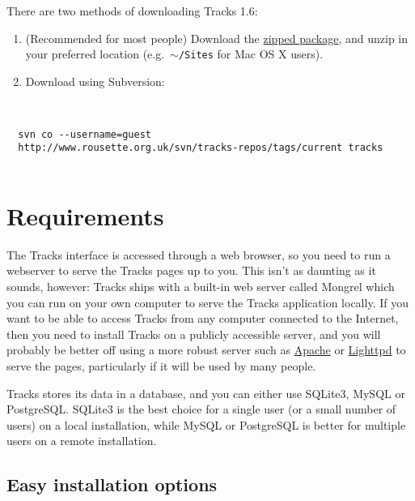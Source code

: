 \documentclass[10pt,twoside]{memoir}
\begin{document}
There are two methods of downloading Tracks 1.6:


\begin{enumerate}


\item (Recommended for most people) Download the \href{http://www.rousette.org.uk/projects/files/tracks-current.zip}{zipped package}, and unzip in your preferred location (e.g.\ \texttt{\ensuremath{\sim}/Sites} for Mac OS X users).

\item Download using Subversion:
\end{enumerate}

\begin{adjustwidth}{2.5em}{2.5em}
\begin{verbatim}


  svn co --username=guest
  http://www.rousette.org.uk/svn/tracks-repos/tags/current tracks


\end{verbatim}
\end{adjustwidth}

\section{Requirements}
\label{requirements}

The Tracks interface is accessed through a web browser, so you need to run a webserver to serve the Tracks pages up to you. This isn't as daunting as it sounds, however: Tracks ships with a built-in web server called Mongrel which you can run on your own computer to serve the Tracks application locally. If you want to be able to access Tracks from any computer connected to the Internet, then you need to install Tracks on a publicly accessible server, and you will probably be better off using a more robust server such as \href{http://www.apache.org/}{Apache} or \href{http://www.lighttpd.net/}{Lighttpd} to serve the pages, particularly if it will be used by many people.


Tracks stores its data in a database, and you can either use SQLite3, MySQL or PostgreSQL. SQLite3 is the best choice for a single user (or a small number of users) on a local installation, while MySQL or PostgreSQL is better for multiple users on a remote installation.


\subsection{Easy installation options}
\label{easyinstallationoptions}
\end{document}
